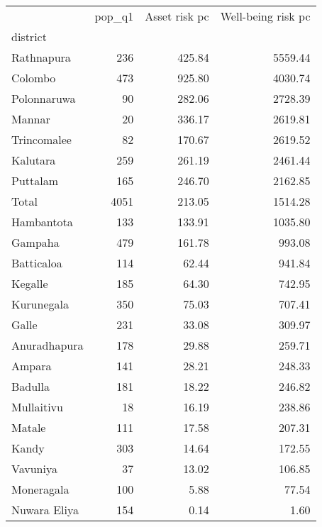 \begin{tabular}{lrrr}
\toprule
{} &  pop\_q1 &  Asset risk pc &  Well-being risk pc \\
district     &         &                &                     \\
\midrule
Rathnapura   &     236 &         425.84 &             5559.44 \\
Colombo      &     473 &         925.80 &             4030.74 \\
Polonnaruwa  &      90 &         282.06 &             2728.39 \\
Mannar       &      20 &         336.17 &             2619.81 \\
Trincomalee  &      82 &         170.67 &             2619.52 \\
Kalutara     &     259 &         261.19 &             2461.44 \\
Puttalam     &     165 &         246.70 &             2162.85 \\
Total        &    4051 &         213.05 &             1514.28 \\
Hambantota   &     133 &         133.91 &             1035.80 \\
Gampaha      &     479 &         161.78 &              993.08 \\
Batticaloa   &     114 &          62.44 &              941.84 \\
Kegalle      &     185 &          64.30 &              742.95 \\
Kurunegala   &     350 &          75.03 &              707.41 \\
Galle        &     231 &          33.08 &              309.97 \\
Anuradhapura &     178 &          29.88 &              259.71 \\
Ampara       &     141 &          28.21 &              248.33 \\
Badulla      &     181 &          18.22 &              246.82 \\
Mullaitivu   &      18 &          16.19 &              238.86 \\
Matale       &     111 &          17.58 &              207.31 \\
Kandy        &     303 &          14.64 &              172.55 \\
Vavuniya     &      37 &          13.02 &              106.85 \\
Moneragala   &     100 &           5.88 &               77.54 \\
Nuwara Eliya &     154 &           0.14 &                1.60 \\
\bottomrule
\end{tabular}
